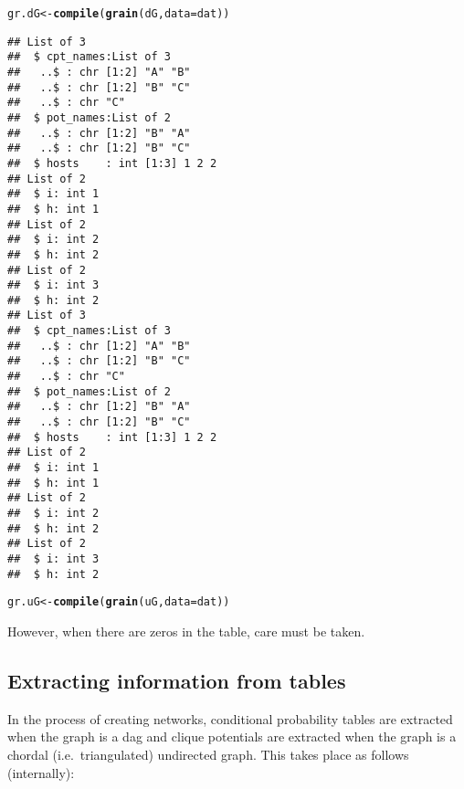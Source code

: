 \documentclass[10pt]{article}\usepackage[]{graphicx}\usepackage[]{xcolor}
\makeatletter
\newcommand{\hlstd}[1]{\textcolor[rgb]{0.345,0.345,0.345}{#1}}%
\newcommand{\hlkwb}[1]{\textcolor[rgb]{0.69,0.353,0.396}{#1}}%
\newcommand{\hlkwc}[1]{\textcolor[rgb]{0.333,0.667,0.333}{#1}}%
\newcommand{\hlkwd}[1]{\textcolor[rgb]{0.737,0.353,0.396}{\textbf{#1}}}%
\newenvironment{kframe}{%
 \def\at@end@of@kframe{}%
 \ifinner\ifhmode%
  \def\at@end@of@kframe{\end{minipage}}%
  \begin{minipage}{\columnwidth}%
 \fi\fi%
 \def\FrameCommand##1{\hskip\@totalleftmargin \hskip-\fboxsep
 \colorbox{shadecolor}{##1}\hskip-\fboxsep
     \hskip-\linewidth \hskip-\@totalleftmargin \hskip\columnwidth}%
 \MakeFramed {\advance\hsize-\width
   \@totalleftmargin\z@ \linewidth\hsize
   \@setminipage}}%
 {\par\unskip\endMakeFramed%
 \at@end@of@kframe}
\newenvironment{knitrout}{}{} %
\makeatother
\begin{document}
\begin{knitrout}
\color{fgcolor}\begin{kframe}
\begin{alltt}
\hlstd{gr.dG} \hlkwb{<-} \hlkwd{compile}\hlstd{(}\hlkwd{grain}\hlstd{( dG,} \hlkwc{data}\hlstd{=dat ))}
\end{alltt}
\begin{verbatim}
## List of 3
##  $ cpt_names:List of 3
##   ..$ : chr [1:2] "A" "B"
##   ..$ : chr [1:2] "B" "C"
##   ..$ : chr "C"
##  $ pot_names:List of 2
##   ..$ : chr [1:2] "B" "A"
##   ..$ : chr [1:2] "B" "C"
##  $ hosts    : int [1:3] 1 2 2
## List of 2
##  $ i: int 1
##  $ h: int 1
## List of 2
##  $ i: int 2
##  $ h: int 2
## List of 2
##  $ i: int 3
##  $ h: int 2
## List of 3
##  $ cpt_names:List of 3
##   ..$ : chr [1:2] "A" "B"
##   ..$ : chr [1:2] "B" "C"
##   ..$ : chr "C"
##  $ pot_names:List of 2
##   ..$ : chr [1:2] "B" "A"
##   ..$ : chr [1:2] "B" "C"
##  $ hosts    : int [1:3] 1 2 2
## List of 2
##  $ i: int 1
##  $ h: int 1
## List of 2
##  $ i: int 2
##  $ h: int 2
## List of 2
##  $ i: int 3
##  $ h: int 2
\end{verbatim}
\begin{alltt}
\hlstd{gr.uG} \hlkwb{<-} \hlkwd{compile}\hlstd{(}\hlkwd{grain}\hlstd{( uG,} \hlkwc{data}\hlstd{=dat ))}
\end{alltt}
\end{kframe}
\end{knitrout}

However, when there are zeros in the table, care must be taken.

\subsection{Extracting information from tables}
\label{sec:extr-inform-from}

In the process of creating networks, conditional probability tables
are extracted when the graph is a dag and clique potentials are
extracted when the graph is a chordal (i.e.\ triangulated) undirected
graph. This takes place as follows (internally):
\end{document}
